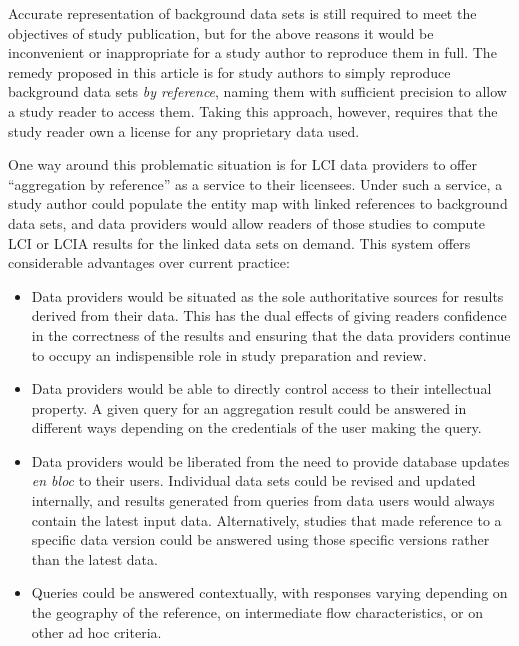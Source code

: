 Accurate representation of background data sets is still required to meet the objectives of study publication, but for the above reasons it would be inconvenient or inappropriate for a study author to reproduce them in full.  The remedy proposed in this article is for study authors to simply reproduce background data sets \emph{by reference}, naming them with sufficient precision to allow a study reader to access them.  Taking this approach, however, requires that the study reader own a license for any proprietary data used.

One way around this problematic situation is for LCI data providers to offer ``aggregation by reference'' as a service to their licensees.  Under such a service, a study author could populate the entity map with linked references to background data sets, and data providers would allow readers of those studies to compute LCI or LCIA results for the linked data sets on demand.  This system offers considerable advantages over current practice:

\begin{itemize}
  \item Data providers would be situated as the sole authoritative sources for results derived from their data.  This has the dual effects of giving readers confidence in the correctness of the results and ensuring that the data providers continue to occupy an indispensible role in study preparation and review.

 \item Data providers would be able to directly control access to their intellectual property.  A given query for an aggregation result could be answered in different ways depending on the credentials of the user making the query.  

 \item Data providers would be liberated from the need to provide database updates \emph{en bloc} to their users.  Individual data sets could be revised and updated internally, and results generated from queries from data users would always contain the latest input data.  Alternatively, studies that made reference to a specific data version could be answered using those specific versions rather than the latest data.

 \item Queries could be answered contextually, with responses varying depending on the geography of the reference, on intermediate flow characteristics, or on other ad hoc criteria.
\end{itemize}


